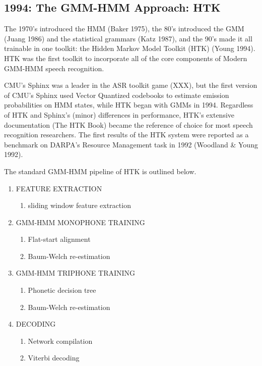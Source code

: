 \documentclass[10pt,a4paper]{article}
\begin{document}
\subsection{1994: The GMM-HMM Approach: HTK}

The 1970's introduced the HMM (Baker 1975), the 80's introduced the GMM (Juang 1986) and the statistical grammars (Katz 1987), and the 90's made it all trainable in one toolkit: the Hidden Markov Model Toolkit (HTK) (Young 1994). HTK was the first toolkit to incorporate all of the core components of Modern GMM-HMM speech recognition.

CMU's Sphinx was a leader in the ASR toolkit game (XXX), but the first version of CMU's Sphinx used Vector Quantized codebooks to estimate emission probabilities on HMM states, while HTK began with GMMs in 1994. Regardless of HTK and Sphinx's (minor) differences in performance, HTK's extensive documentation (The HTK Book) became the reference of choice for most speech recognition researchers. The first results of the HTK system were reported as a benchmark on DARPA's Resource Management task in 1992 (Woodland \& Young 1992).

The standard GMM-HMM pipeline of HTK is outlined below. 


\begin{enumerate}

\item FEATURE EXTRACTION
  \begin{enumerate}
  \item sliding window feature extraction
  \end{enumerate}

\item GMM-HMM MONOPHONE TRAINING
  \begin{enumerate}
  \item Flat-start alignment
  \item Baum-Welch re-estimation
  \end{enumerate}
  
\item GMM-HMM TRIPHONE TRAINING
  \begin{enumerate}
  \item Phonetic decision tree
  \item Baum-Welch re-estimation
  \end{enumerate}
  
\item DECODING
  \begin{enumerate}
  \item Network compilation
  \item Viterbi decoding
  \end{enumerate}
  
\end{enumerate}
\end{document}
